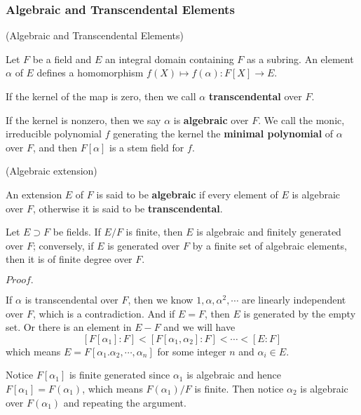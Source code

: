 \documentclass{article}
\newcommand{\Pf}[1]{$Proof.$\par}
\begin{document}
\subsubsection{Algebraic and Transcendental Elements}

\begin{definition}
    (Algebraic and Transcendental Elements)\par
    Let $F$ be a field and $E$ an integral domain containing $F$ as a subring. An element $\alpha$ of $E$ defines a homomorphism $f(X)\mapsto f(\alpha): F[X] \to E$.\par
    If the kernel of the map is zero, then we call $\alpha$ \textbf{transcendental} over $F$.\par
    If the kernel is nonzero, then we say $\alpha$ is \textbf{algebraic} over $F$. We call the monic, irreducible polynomial $f$ generating the kernel the \textbf{minimal polynomial} of $\alpha$ over $F$, and then $F[\alpha]$ is a stem field for $f$.
\end{definition}

\begin{definition}
    (Algebraic extension)\par
    An extension $E$ of $F$ is said to be \textbf{algebraic} if every element of $E$ is algebraic over $F$, otherwise it is said to be \textbf{transcendental}.
\end{definition}

\begin{proposition}
    Let $E\supset F$ be fields. If $E/F$ is finite, then $E$ is algebraic and finitely generated over $F$; conversely, if $E$ is generated over $F$ by a finite set of algebraic elements, then it is of finite degree over $F$.
\end{proposition}
\Pf\par
    If $\alpha$ is transcendental over $F$, then we know $1,\alpha,\alpha^2,\cdots$ are linearly independent over $F$, which is a contradiction. And if $E = F$, then $E$ is generated by the empty set. Or there is an element in $E-F$ and we will have
    \[[F[\alpha_1]:F] < [F[\alpha_1,\alpha_2]:F]<\cdots<[E:F]\]
    which means $E = F[\alpha_1.\alpha_2,\cdots,\alpha_n]$ for some integer $n$ and $\alpha_i \in E$.\par
    Notice $F[\alpha_1]$ is finite generated since $\alpha_1$ is algebraic and hence $F[\alpha_1] = F(\alpha_1)$, which means $F(\alpha_1)/F$ is finite. Then notice $\alpha_2$ is algebraic over $F(\alpha_1)$ and repeating the argument.
\end{document}
